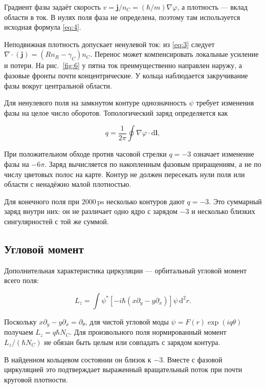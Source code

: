 \documentclass[12pt,a4paper]{article}
\begin{document}
Градиент фазы задаёт скорость $v=\mathbf j/n_{C}=(\hbar/m)\nabla \varphi$, а плотность --- вклад области в ток. В нулях поля фаза не определена, поэтому там используется исходная формула \eqref{eq:4}.

Неподвижная плотность допускает ненулевой ток: из \eqref{eq:3} следует $\nabla\cdot(\mathbf j)=(R n_{R}-\gamma_{C})n_{C}$. Перенос может компенсировать локальные усиление и потери. На рис.~\ref{fig:6} у пятна ток преимущественно направлен наружу, а фазовые фронты почти концентрические. У кольца наблюдается закручивание фазы вокруг центральной области.

Для ненулевого поля на замкнутом контуре однозначность $\psi$ требует изменения фазы на целое число оборотов. Топологический заряд определяется как

\begin{equation}\label{eq:30}
q=\frac{1}{2\pi}\oint\nabla\varphi\cdot\mathrm d\mathbf l,\end{equation}

При положительном обходе против часовой стрелки \mbox{$q=-3$} означает изменение фазы на $-6 \pi$. Заряд вычисляется по накопленным фазовым приращениям, а не по числу цветовых полос на карте. Контур не должен пересекать нули поля или области с ненадёжно малой плотностью.

Для конечного поля при $2000\,\mathrm{ps}$ несколько контуров дают \mbox{$q=-3$}. Это суммарный заряд внутри них: он не различает одно ядро с зарядом $-3$ и несколько близких сингулярностей с той же суммой.

\subsection{Угловой момент}\label{sec:6.3}

Дополнительная характеристика циркуляции --- орбитальный угловой момент всего поля:

\begin{equation}\label{eq:31}
L_z=\int\psi^*[-i\hbar(x\partial_y-y\partial_x)]\psi\,\mathrm d^2r.\end{equation}

Поскольку $x \partial_{y}-y \partial_{x}=\partial_{\theta}$, для чистой угловой моды $\psi=F(r)\exp(i q \theta)$ получаем $L_{z}=q \hbar N_{C}$. Для произвольного поля нормированный момент $L_{z}/(\hbar N_{C})$ не обязан быть целым или совпадать с зарядом контура.

В найденном кольцевом состоянии он близок к $-3$. Вместе с фазовой циркуляцией это подтверждает выраженный вращательный поток при почти круговой плотности.
\end{document}
